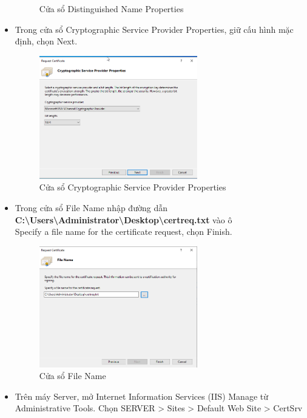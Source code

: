 \documentclass[13pt]{report}
\begin{document}
\begin{itemize}
\begin{figure}[htp]
			\caption{Cửa sổ Distinguished Name Properties}
		\end{figure}
		\newpage
		\item Trong cửa sổ Cryptographic Service Provider Properties, giữ cấu hình mặc định, chọn Next. 
		\begin{figure}[htp]
			\centering
			\includegraphics[width=0.65\textwidth]{image/Gui/SSL/4.png}
			\caption{Cửa sổ Cryptographic Service Provider Properties}
		\end{figure}
		\item Trong cửa sổ File Name nhập đường dẫn \\\textbf{C:\textbackslash Users\textbackslash Administrator\textbackslash Desktop\textbackslash certreq.txt} vào ô \\Specify a file name for the certificate request, chọn Finish.
		\begin{figure}[htp]
			\centering
			\includegraphics[width=0.65\textwidth]{image/Gui/SSL/5.png}
			\caption{Cửa sổ File Name}
		\end{figure}
		\newpage
		\item Trên máy Server, mở Internet Information Services (IIS) Manage từ Administrative Tools. Chọn SERVER > Sites > Default Web Site > CertSrv		\begin{figure}[htp]

\end{figure}
\end{itemize}
\end{document}
